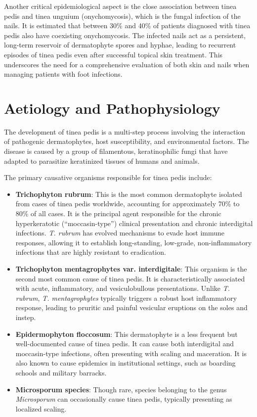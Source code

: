 Another critical epidemiological aspect is the close association between tinea pedis and tinea unguium (onychomycosis), which is the fungal infection of the nails. It is estimated that between 30\% and 40\% of patients diagnosed with tinea pedis also have coexisting onychomycosis. The infected nails act as a persistent, long-term reservoir of dermatophyte spores and hyphae, leading to recurrent episodes of tinea pedis even after successful topical skin treatment. This underscores the need for a comprehensive evaluation of both skin and nails when managing patients with foot infections.

\section*{Aetiology and Pathophysiology}
The development of tinea pedis is a multi-step process involving the interaction of pathogenic dermatophytes, host susceptibility, and environmental factors. The disease is caused by a group of filamentous, keratinophilic fungi that have adapted to parasitize keratinized tissues of humans and animals.

The primary causative organisms responsible for tinea pedis include:
\begin{itemize}
    \item \textbf{Trichophyton rubrum}: This is the most common dermatophyte isolated from cases of tinea pedis worldwide, accounting for approximately 70\% to 80\% of all cases. It is the principal agent responsible for the chronic hyperkeratotic (``moccasin-type'') clinical presentation and chronic interdigital infections. \textit{T. rubrum} has evolved mechanisms to evade host immune responses, allowing it to establish long-standing, low-grade, non-inflammatory infections that are highly resistant to eradication.
    \item \textbf{Trichophyton mentagrophytes var. interdigitale}: This organism is the second most common cause of tinea pedis. It is characteristically associated with acute, inflammatory, and vesiculobullous presentations. Unlike \textit{T. rubrum}, \textit{T. mentagrophytes} typically triggers a robust host inflammatory response, leading to pruritic and painful vesicular eruptions on the soles and instep.
    \item \textbf{Epidermophyton floccosum}: This dermatophyte is a less frequent but well-documented cause of tinea pedis. It can cause both interdigital and moccasin-type infections, often presenting with scaling and maceration. It is also known to cause epidemics in institutional settings, such as boarding schools and military barracks.
    \item \textbf{Microsporum species}: Though rare, species belonging to the genus \textit{Microsporum} can occasionally cause tinea pedis, typically presenting as localized scaling.
\end{itemize}

